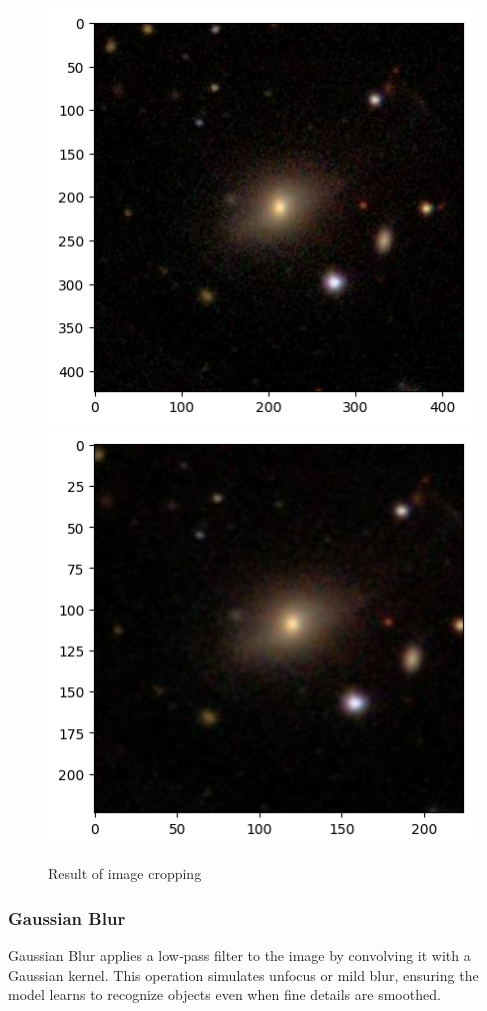 \begin{figure}[htbp]\centering
  \centering
  \includegraphics[width=0.5\linewidth]{obrazky-figures/03-dataset/orig.png}\hfill
  \includegraphics[width=0.5\linewidth]{obrazky-figures/03-dataset/crop.png}
  \caption{Result of image cropping}
  \label{fig:dataset-crop}
\end{figure}

\subsubsection*{Gaussian Blur}

Gaussian Blur applies a low‐pass filter to the image by convolving it with a Gaussian kernel. This operation simulates unfocus or mild blur, ensuring the model learns to recognize objects even when fine details are smoothed.

